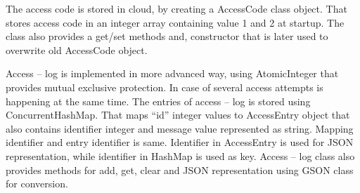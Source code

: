 The access code is stored in cloud, by creating a AccessCode class object. That stores access code in an integer array containing value 1 and 2 at startup. The class also provides a get/set methods and, constructor that is later used to overwrite old AccessCode object. 
\newline

Access – log is implemented in more advanced way, using AtomicInteger that provides mutual exclusive protection. In case of several access attempts is happening at the same time. The entries of access – log is stored using ConcurrentHashMap. That maps “id” integer values to AccessEntry object that also contains identifier integer and message value represented as string. Mapping identifier and entry identifier is same. Identifier in AccessEntry is used for JSON representation, while identifier in HashMap is used as key. Access – log class also provides methods for add, get, clear and JSON representation using GSON class for conversion. 



